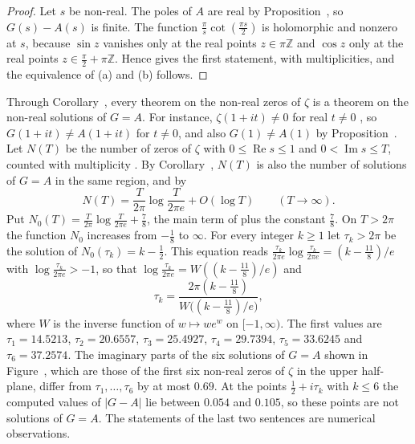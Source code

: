 \begin{proof}
Let $s$ be non-real. The poles of $A$ are real by Proposition~, so $G(s)-A(s)$ is finite. The function $\frac\pi s\cot(\frac{\pi s}2)$ is holomorphic and nonzero at $s$, because $\sin z$ vanishes only at the real points $z\in\pi\mathbb Z$ and $\cos z$ only at the real points $z\in\frac\pi2+\pi\mathbb Z$. Hence  gives the first statement, with multiplicities, and the equivalence of \textup{(a)} and \textup{(b)} follows.
\end{proof}

Through Corollary~, every theorem on the non-real zeros of $\zeta$ is a theorem on the non-real solutions of $G=A$. For instance, $\zeta(1+it)\ne0$ for real $t\ne0$ \cite[\S3.1, p.~45]{Titchmarsh1986}, so $G(1+it)\ne A(1+it)$ for $t\ne0$, and also $G(1)\ne A(1)$ by Proposition~. Let $N(T)$ be the number of zeros of $\zeta$ with $0\le\operatorname{Re}s\le1$ and $0<\operatorname{Im}s\le T$, counted with multiplicity \cite[\S9.2, p.~211]{Titchmarsh1986}. By Corollary~, $N(T)$ is also the number of solutions of $G=A$ in the same region, and by \cite[Theorem~9.4, p.~214]{Titchmarsh1986}
\begin{equation}\label{eq:NT}
N(T)=\frac T{2\pi}\log\frac T{2\pi e}+O(\log T)\qquad(T\to\infty).
\end{equation}
Put $N_0(T)=\frac T{2\pi}\log\frac T{2\pi e}+\frac78$, the main term of  plus the constant $\frac78$. On $T>2\pi$ the function $N_0$ increases from $-\frac18$ to $\infty$. For every integer $k\ge1$ let $\tau_k>2\pi$ be the solution of $N_0(\tau_k)=k-\frac12$. This equation reads $\frac{\tau_k}{2\pi e}\log\frac{\tau_k}{2\pi e}=(k-\frac{11}8)/e$ with $\log\frac{\tau_k}{2\pi e}>-1$, so that $\log\frac{\tau_k}{2\pi e}=W((k-\frac{11}8)/e)$ and
\begin{equation}\label{eq:tauk}
\tau_k=\frac{2\pi(k-\frac{11}8)}{W\bigl((k-\frac{11}8)/e\bigr)},
\end{equation}
where $W$ is the inverse function of $w\mapsto we^w$ on $[-1,\infty)$. The first values are $\tau_1=14.5213$, $\tau_2=20.6557$, $\tau_3=25.4927$, $\tau_4=29.7394$, $\tau_5=33.6245$ and $\tau_6=37.2574$. The imaginary parts of the six solutions of $G=A$ shown in Figure~, which are those of the first six non-real zeros of $\zeta$ in the upper half-plane, differ from $\tau_1,\dots,\tau_6$ by at most $0.69$. At the points $\frac12+i\tau_k$ with $k\le6$ the computed values of $|G-A|$ lie between $0.054$ and $0.105$, so these points are not solutions of $G=A$. The statements of the last two sentences are numerical observations.

